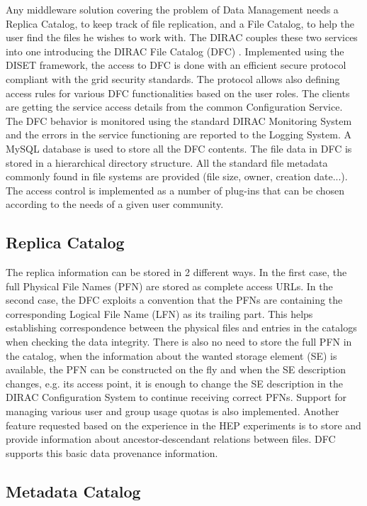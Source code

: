 Any middleware solution covering the problem of Data Management needs a Replica Catalog, to keep track of 
file replication, and a File Catalog, to help the user find the files he wishes to work with. The DIRAC 
couples these two services into one introducing the DIRAC File Catalog (DFC) \cite{DFC}. 
Implemented using the DISET framework, the access to DFC is done with an efficient secure 
protocol compliant with the grid security standards.
The protocol allows also defining access rules for various DFC functionalities based on the user roles. The
clients are getting the service access details from the common Configuration Service. The DFC behavior
is monitored using the standard DIRAC Monitoring System and the errors in the service functioning are
reported to the Logging System. A MySQL database is used to store all the DFC contents. %
The file data in DFC is stored in a hierarchical directory structure. All the standard file metadata 
commonly found in file systems are provided (file size, owner, creation date...). The access control 
is implemented as a number of plug-ins that can be chosen according to the needs of a given user community.


\subsection{Replica Catalog}

The replica information can be stored in 2 different ways. In the first case, the full Physical File
Names (PFN) are stored as complete access URLs. In the second case, the DFC exploits a convention
that the PFNs are containing the corresponding Logical File Name (LFN) as its trailing part. This helps 
establishing correspondence between the physical files and entries in the catalogs when checking 
the data integrity. There is also no need to store the full PFN in the catalog, when
the information about the wanted storage element (SE) is available, the PFN can be constructed on the fly and when 
the SE description changes, e.g. its access point, it is enough to change the SE description in the DIRAC 
Configuration System to continue receiving correct PFNs. Support for managing various user and group usage 
quotas is also implemented. Another feature requested based on the experience in 
the HEP experiments is to store and provide information about ancestor-descendant relations between files. 
DFC supports this basic data provenance information. 

\subsection{Metadata Catalog}

